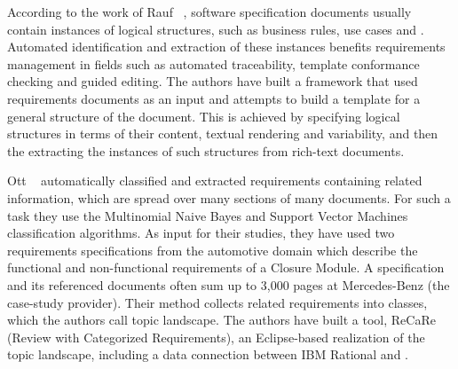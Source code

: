According to the work of Rauf \etal~\cite{Rauf:2011}, software specification
documents usually contain instances of logical structures, such as business rules, use cases and
\FRs. Automated identification and extraction of these instances benefits
requirements management in fields such as automated traceability, template
conformance checking and guided editing. The authors have built a framework that
used requirements documents as an input and attempts to build a template for
a general structure of the document. This is achieved by specifying
logical structures in terms of their content, textual rendering and variability,
and then the extracting the instances of such structures from rich-text documents.

Ott \etal~\cite{Ott:2013} automatically classified and extracted requirements
containing related information, which are spread over many sections of many
documents. For such a task they use the Multinomial Naive Bayes and Support
Vector Machines classification algorithms. As input for their studies, they have
used two requirements specifications from the automotive domain which describe
the functional and non-functional requirements of a \DOORS Closure Module. A
specification and its referenced documents often sum up to 3,000 pages at
Mercedes-Benz (the case-study provider). Their method collects related
requirements into classes, which the authors call topic landscape. The
authors have built a tool, ReCaRe (Review with Categorized Requirements), an
Eclipse-based realization of the topic landscape, including a data connection
between IBM Rational and \DOORS.





